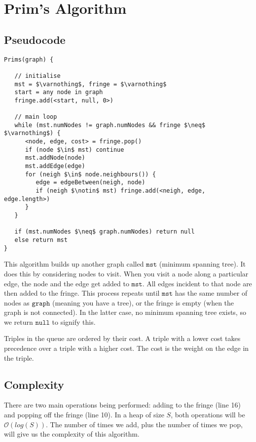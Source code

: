 \documentclass[a4paper,12pt]{article}
\newcommand{\kwa}[1]{\mathtt{#1}}
\begin{document}
%

\section{Prim's Algorithm}

\subsection{Pseudocode}
\begin{lstlisting}
Prims(graph) {

   // initialise
   mst = $\varnothing$, fringe = $\varnothing$
   start = any node in graph
   fringe.add(<start, null, 0>)
   
   // main loop
   while (mst.numNodes != graph.numNodes && fringe $\neq$ $\varnothing$) {
      <node, edge, cost> = fringe.pop()
      if (node $\in$ mst) continue
      mst.addNode(node)
      mst.addEdge(edge)
      for (neigh $\in$ node.neighbours()) {
         edge = edgeBetween(neigh, node)
         if (neigh $\notin$ mst) fringe.add(<neigh, edge, edge.length>)
      }
   }
   
   if (mst.numNodes $\neq$ graph.numNodes) return null
   else return mst
}
\end{lstlisting}

\noindent
This algorithm builds up another graph called $\kwa{mst}$ (minimum spanning tree). It does this by considering nodes to visit. When you visit a node along a particular edge, the node and the edge get added to $\kwa{mst}$. All edges incident to that node are then added to the fringe. This process repeats until $\kwa{mst}$ has the same number of nodes as $\kwa{graph}$ (meaning you have a tree), or the fringe is empty (when the graph is not connected). In the latter case, no minimum spanning tree exists, so we return $\kwa{null}$ to signify this.

Triples in the queue are ordered by their cost. A triple with a lower cost takes precedence over a triple with a higher cost. The cost is the weight on the edge in the triple.

\subsection{Complexity}

There are two main operations being performed: adding to the fringe (line 16) and popping off the fringe (line 10). In a heap of size $S$, both operations will be $\mathcal{O}(log(S))$. The number of times we add, plus the number of times we pop, will give us the complexity of this algorithm.
\end{document}
